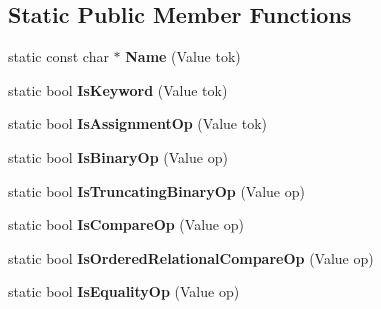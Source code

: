 \subsection*{Static Public Member Functions}
\begin{DoxyCompactItemize}
\item 
\hypertarget{classv8_1_1internal_1_1_token_a5a0e5f489eb832d50cbe60e95b5bffbb}{}static const char $\ast$ {\bfseries Name} (Value tok)\label{classv8_1_1internal_1_1_token_a5a0e5f489eb832d50cbe60e95b5bffbb}

\item 
\hypertarget{classv8_1_1internal_1_1_token_a55915790c51b39e7d6363d85a09f2ce9}{}static bool {\bfseries Is\+Keyword} (Value tok)\label{classv8_1_1internal_1_1_token_a55915790c51b39e7d6363d85a09f2ce9}

\item 
\hypertarget{classv8_1_1internal_1_1_token_adf85802a53291707404da2235b768962}{}static bool {\bfseries Is\+Assignment\+Op} (Value tok)\label{classv8_1_1internal_1_1_token_adf85802a53291707404da2235b768962}

\item 
\hypertarget{classv8_1_1internal_1_1_token_a6c86b8c0b5c1a31d853a2edad571fb74}{}static bool {\bfseries Is\+Binary\+Op} (Value op)\label{classv8_1_1internal_1_1_token_a6c86b8c0b5c1a31d853a2edad571fb74}

\item 
\hypertarget{classv8_1_1internal_1_1_token_af78665f3ffed712b3047e0410db32e5a}{}static bool {\bfseries Is\+Truncating\+Binary\+Op} (Value op)\label{classv8_1_1internal_1_1_token_af78665f3ffed712b3047e0410db32e5a}

\item 
\hypertarget{classv8_1_1internal_1_1_token_a62cc331f6e96e759020975c50a9aef72}{}static bool {\bfseries Is\+Compare\+Op} (Value op)\label{classv8_1_1internal_1_1_token_a62cc331f6e96e759020975c50a9aef72}

\item 
\hypertarget{classv8_1_1internal_1_1_token_a5374bee5a77c04a854e00e97bd205aa3}{}static bool {\bfseries Is\+Ordered\+Relational\+Compare\+Op} (Value op)\label{classv8_1_1internal_1_1_token_a5374bee5a77c04a854e00e97bd205aa3}

\item 
\hypertarget{classv8_1_1internal_1_1_token_ad7ff5a7e1c7fcce3f0e0543699f4b516}{}static bool {\bfseries Is\+Equality\+Op} (Value op)\label{classv8_1_1internal_1_1_token_ad7ff5a7e1c7fcce3f0e0543699f4b516}


\end{DoxyCompactItemize}
